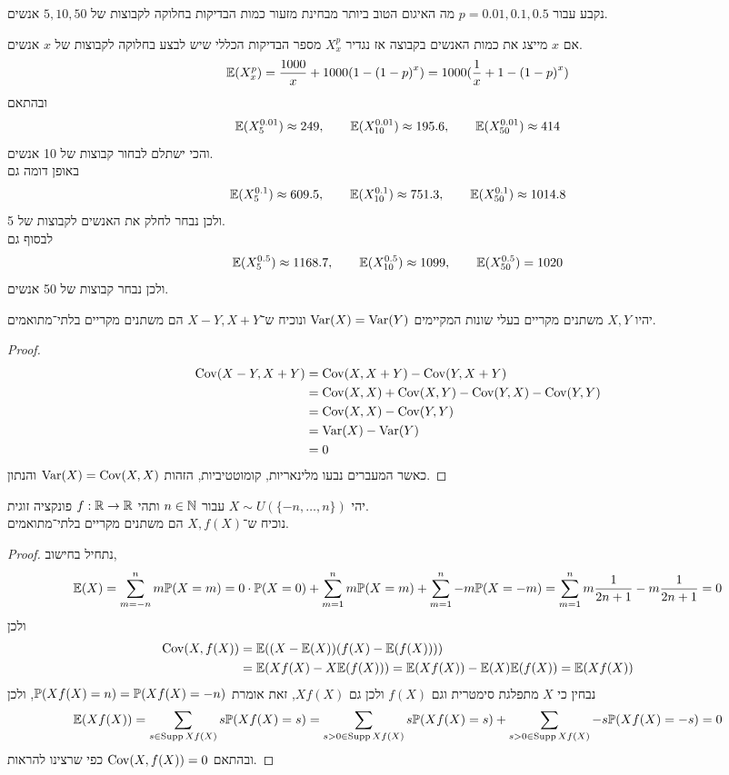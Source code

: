 \subquestion{}
נקבע עבור $p = 0.01, 0.1, 0.5$ מה האיגום הטוב ביותר מבחינת מזעור כמות הבדיקות בחלוקה לקבוצות של $5, 10, 50$ אנשים.
\begin{solution}
	אם $x$ מייצג את כמות האנשים בקבוצה אז נגדיר $X_x^p$ מספר הבדיקות הכללי שיש לבצע בחלוקה לקבוצות של $x$ אנשים.
	\[
		\mathbb{E}(X_x^p)
		= \frac{1000}{x} + 1000(1 - {(1 - p)}^x)
		= 1000(\frac{1}{x} + 1 - {(1 - p)}^x)
	\]
	ובהתאם
	\[
		\mathbb{E}(X_5^{0.01}) \approx 249,
		\qquad \mathbb{E}(X_{10}^{0.01}) \approx 195.6,
		\qquad \mathbb{E}(X_{50}^{0.01}) \approx 414
	\]
	והכי ישתלם לבחור קבוצות של 10 אנשים. \\
	באופן דומה גם
	\[
		\mathbb{E}(X_5^{0.1}) \approx 609.5,
		\qquad \mathbb{E}(X_{10}^{0.1}) \approx 751.3,
		\qquad \mathbb{E}(X_{50}^{0.1}) \approx 1014.8
	\]
	ולכן נבחר לחלק את האנשים לקבוצות של 5. \\
	לבסוף גם
	\[
		\mathbb{E}(X_5^{0.5}) \approx 1168.7,
		\qquad \mathbb{E}(X_{10}^{0.5}) \approx 1099,
		\qquad \mathbb{E}(X_{50}^{0.5}) = 1020
	\]
	ולכן נבחר קבוצות של 50 אנשים.
\end{solution}

\question{}
יהיו $X, Y$ משתנים מקריים בעלי שונות המקיימים $\operatorname{Var}(X) = \operatorname{Var}(Y)$ ונוכיח ש־$X - Y, X + Y$ הם משתנים מקריים בלתי־מתואמים.
\begin{proof}
	\begin{align*}
		\operatorname{Cov}(X - Y, X + Y)
		& = \operatorname{Cov}(X, X + Y) - \operatorname{Cov}(Y, X + Y) \\
		& = \operatorname{Cov}(X, X) + \operatorname{Cov}(X, Y) - \operatorname{Cov}(Y, X) - \operatorname{Cov}(Y, Y) \\
		& = \operatorname{Cov}(X, X) - \operatorname{Cov}(Y, Y) \\
		& = \operatorname{Var}(X) - \operatorname{Var}(Y) \\
		& = 0
	\end{align*}
	כאשר המעברים נבעו מלינאריות, קומוטטיביות, הזהות $\operatorname{Var}(X) = \operatorname{Cov}(X, X)$ והנתון.
\end{proof}

\question{}
יהי $X \sim U(\{-n, \dots, n\})$ עבור $n \in \mathbb{N}$ ותהי $f : \mathbb{R} \to \mathbb{R}$ פונקציה זוגית. \\
נוכיח ש־$X, f(X)$ הם משתנים מקריים בלתי־מתואמים.
\begin{proof}
	נתחיל בחישוב,
	\[
		\mathbb{E}(X)
		= \sum_{m = -n}^{n} m \mathbb{P}(X = m)
		= 0 \cdot \mathbb{P}(X = 0) + \sum_{m = 1}^{n} m \mathbb{P}(X = m) + \sum_{m = 1}^{n} -m \mathbb{P}(X = -m)
		= \sum_{m = 1}^{n} m \frac{1}{2n + 1} - m \frac{1}{2n + 1}
		= 0
	\]
	ולכן
	\begin{align*}
		\operatorname{Cov}(X, f(X))
		& = \mathbb{E}((X - \mathbb{E}(X))(f(X) - \mathbb{E}(f(X)))) \\
		& = \mathbb{E}(X f(X) - X \mathbb{E}(f(X)))
		= \mathbb{E}(X f(X)) - \mathbb{E}(X) \mathbb{E}(f(X))
		= \mathbb{E}(X f(X))
	\end{align*}
	נבחין כי $X$ מתפלגת סימטרית וגם $f(X)$ ולכן גם $X f(X)$, זאת אומרת $\mathbb{P}(X f(X) = n) = \mathbb{P}(X f(X) = -n)$, ולכן
	\[
		\mathbb{E}(X f(X))
		= \sum_{s \in \operatorname{Supp} X f(X)} s \mathbb{P}(X f(X) = s)
		= \sum_{s > 0 \in \operatorname{Supp} X f(X)} s \mathbb{P}(X f(X) = s)
		+ \sum_{s > 0 \in \operatorname{Supp} X f(X)} -s \mathbb{P}(X f(X) = -s)
		= 0
	\]
	ובהתאם $\operatorname{Cov}(X, f(X)) = 0$ כפי שרצינו להראות.
\end{proof}

